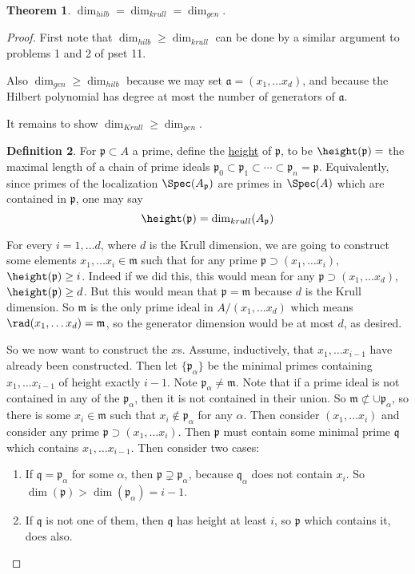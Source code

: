 \documentclass[12 pt]{article}
\theoremstyle{definition}
\newtheorem{thm}{Theorem}[section]
\newtheorem{defn}[thm]{Definition}
\renewcommand{\(}{\left(}
\renewcommand{\)}{\right)}
\newcommand\fa{{\mathfrak a}}
\newcommand\fp{{\mathfrak p}}
\newcommand\fq{{\mathfrak q}}
\newcommand\fm{{\mathfrak m}}
\begin{document}
\begin{thm} $\dim_{hilb}=\dim_{krull}=\dim_{gen}$.
\end{thm}
\begin{proof}
First note that $\dim_{hilb} \geq \dim_{krull}$ can be done by a similar argument to problems 1 and 2 of pset 11.

Also $\dim_{gen} \geq \dim_{hilb}$ because we may set $\fa=(x_1, \ldots x_d)$, and because the Hilbert polynomial has degree at most the number of generators of $\fa$.

It remains to show $\dim_{Krull} \geq \dim_{gen}$.

\begin{defn} For $\fp \subset A$ a prime, define the \underline{height} of $\fp$, to be $\height(\fp)=$ the maximal length of a chain of prime ideals $\fp_0 \subset \fp_1 \subset \cdots \subset \fp_n=\fp$. Equivalently, since primes of the localization $\Spec(A_{\fp})$ are primes in $\Spec(A)$ which are contained in $\fp$, one may say
\[\height(\fp)=\dim_{krull}(A_\fp)\]
\end{defn}

For every $i=1, \ldots d$, where $d$ is the Krull dimension, we are going to construct some elements $x_1, \ldots x_i \in \fm$ such that for any prime $\fp \supset (x_1, \ldots x_i)$, $\height(\fp) \geq i$. Indeed if we did this, this would mean for any $\fp \supset (x_1, \ldots x_d)$, $\height(\fp) \geq d$. But this would mean that $\fp=\fm$ because $d$ is the Krull dimension. So $\fm$ is the only prime ideal in $A/(x_1, \ldots x_d)$ which means $\rad(x_1, \ldots x_d)=\fm$, so the generator dimension would be at most $d$, as desired.

So we now want to construct the $x$s. Assume, inductively, that $x_1, \ldots x_{i-1}$ have already been constructed. Then let $\{\fp_\alpha\}$ be the minimal primes containing $x_1, \ldots x_{i-1}$ of height exactly $i-1$. Note $\fp_\alpha \neq \fm$. Note that if a prime ideal is not contained in any of the $\fp_\alpha$, then it is not contained in their union. So $\fm \not \subset \cup \fp_\alpha$, so there is some $x_i \in \fm$ such that $x_i \not \in \fp_\alpha$ for any $\alpha$. Then consider $(x_1, \ldots x_i)$ and consider any prime $\fp \supset (x_1, \ldots x_i)$. Then $\fp$ must contain some minimal prime $\fq$ which contains $x_1, \ldots x_{i-1}$. Then consider two cases:
\begin{enumerate}
\item If $\fq=\fp_\alpha$ for some $\alpha$, then $\fp \supsetneq \fp_\alpha$, because $\fq_\alpha$ does not contain $x_i$. So $\dim(\fp)>\dim(\fp_\alpha)=i-1$.

\item If $\fq$ is not one of them, then $\fq$ has height at least $i$, so $\fp$ which contains it, does also.
\end{enumerate}

\end{proof}
\end{document}
